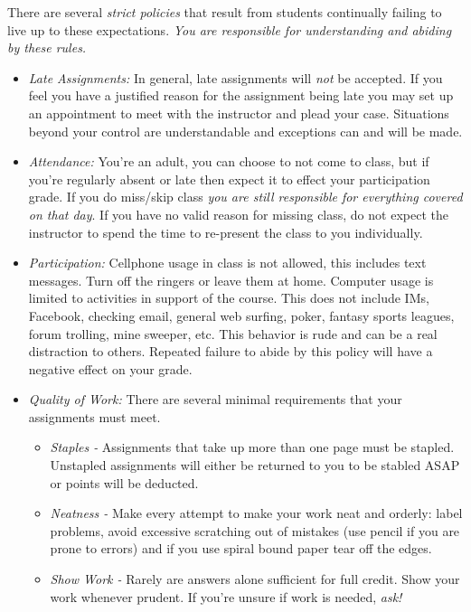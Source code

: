 \documentclass[10pt]{article}
\begin{document}
There are several \textit{strict policies} that result from students continually failing to live up to these expectations.  \textit{You are responsible for understanding and abiding by these rules.}
\begin{itemize}
\item \textit{Late Assignments: }In general, late assignments will \textit{not} be accepted.  If you feel you have a justified reason for the assignment being late you may set up an appointment to meet with the instructor and plead your case.  Situations beyond your control are understandable and exceptions can and will be made.
\item \textit{Attendance: }You're an adult, you can choose to not come to class, but if you're regularly absent or late then expect it to effect your participation grade.  If you do miss/skip class \textit{you are still responsible for everything covered on that day}.  If you have no valid reason for missing class, do not expect the instructor to spend the time to re-present the class to you individually.   
\item \textit{Participation: }  Cellphone usage in class is not allowed, this includes text messages.  Turn off the ringers or leave them at home.  Computer usage is limited to activities in support of the course.  This does not include IMs, Facebook, checking email, general web surfing, poker, fantasy sports leagues, forum trolling, mine sweeper, etc.  This behavior is rude and can be a real distraction to others.  Repeated failure to abide by this policy will have a negative effect on your grade.  
\item \textit{Quality of Work:} There are several minimal requirements that your assignments must meet.
\begin{itemize}
\item \textit{Staples - } Assignments that take up more than one page must be stapled.  Unstapled assignments will either be returned to you to be stabled ASAP or points will be deducted.  
\item \textit{Neatness - }  Make every attempt to make your work neat and orderly:  label problems, avoid excessive scratching out of mistakes (use pencil if you are prone to errors) and if you use spiral bound paper tear off the edges. 
\item \textit{Show Work - } Rarely are answers alone sufficient for full credit.  Show your work whenever prudent.  If you're unsure if work is needed, \textit{ask!}
\end{itemize}
\end{itemize}
\end{document}
